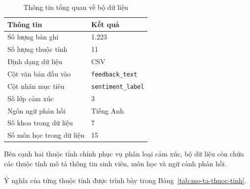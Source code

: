 \begin{table}[H]
    \centering
    \caption{Thông tin tổng quan về bộ dữ liệu}
    \label{tab:tong-quan-du-lieu}
    \renewcommand{\arraystretch}{1.15}

    \begin{tabularx}{\textwidth}{|X|X|}
        \hline
        \textbf{Thông tin} & \textbf{Kết quả} \\
        \hline
        Số lượng bản ghi & 1.223 \\
        \hline
        Số lượng thuộc tính & 11 \\
        \hline
        Định dạng dữ liệu & CSV \\
        \hline
        Cột văn bản đầu vào & \texttt{feedback\_text} \\
        \hline
        Cột nhãn mục tiêu & \texttt{sentiment\_label} \\
        \hline
        Số lớp cảm xúc & 3 \\
        \hline
        Ngôn ngữ phản hồi & Tiếng Anh \\
        \hline
        Số khoa trong dữ liệu & 7 \\
        \hline
        Số môn học trong dữ liệu & 15 \\
        \hline
    \end{tabularx}
\end{table}

Bên cạnh hai thuộc tính chính phục vụ phân loại cảm xúc, bộ dữ liệu còn chứa các thuộc tính mô tả thông tin sinh viên, môn học và ngữ cảnh phản hồi.

Ý nghĩa của từng thuộc tính được trình bày trong Bảng~\ref{tab:mo-ta-thuoc-tinh}.

